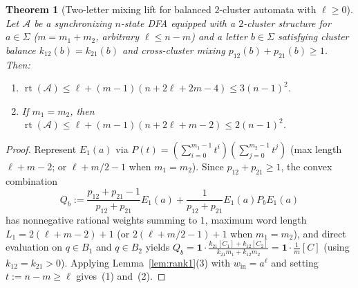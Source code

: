 \documentclass[11pt,a4paper]{article}
\newtheorem{theorem}{Theorem}[section]
\theoremstyle{definition}
\theoremstyle{remark}
\newcommand{\rt}{\operatorname{rt}}
\newcommand{\one}{\mathbf{1}}
\newcommand{\cA}{\mathcal{A}}
\newcommand{\ind}[1]{[#1]}
\begin{document}
\begin{theorem}[Two-letter mixing lift for balanced $2$-cluster automata with $\ell \ge 0$]
\label{thm:mixing}
Let $\cA$ be a synchronizing $n$-state DFA equipped with a $2$-cluster structure for $a \in \Sigma$ ($m = m_1 + m_2$, arbitrary $\ell \le n - m$) and a letter $b \in \Sigma$ satisfying cluster balance $k_{12}(b) = k_{21}(b)$ and cross-cluster mixing $p_{12}(b) + p_{21}(b) \ge 1$. Then:
\begin{enumerate}[label=(\arabic*),nosep]
  \item $\rt(\cA) \le \ell + (m - 1)(n + 2\ell + 2m - 4) \le 3(n - 1)^2$.
  \item If $m_1 = m_2$, then $\rt(\cA) \le \ell + (m - 1)(n + 2\ell + m - 2) \le 2(n - 1)^2$.
\end{enumerate}
\end{theorem}
\begin{proof}
Represent $E_1(a)$ via $P(t) = (\sum_{i=0}^{m_1-1} t^i)(\sum_{j=0}^{m_2-1} t^j)$ (max length $\ell + m - 2$; or $\ell + m/2 - 1$ when $m_1 = m_2$). Since $p_{12} + p_{21} \ge 1$, the convex combination
\[
  Q_b := \frac{p_{12} + p_{21} - 1}{p_{12} + p_{21}} E_1(a) + \frac{1}{p_{12} + p_{21}} E_1(a) P_b E_1(a)
\]
has nonnegative rational weights summing to $1$, maximum word length $L_1 = 2(\ell + m - 2) + 1$ (or $2(\ell + m/2 - 1) + 1$ when $m_1 = m_2$), and direct evaluation on $q \in B_1$ and $q \in B_2$ yields $Q_b = \one \cdot \frac{k_{21}\ind{C_1} + k_{12}\ind{C_2}}{k_{21}m_1 + k_{12}m_2} = \one \cdot \frac{1}{m}\ind{C}$ (using $k_{12} = k_{21} > 0$). Applying Lemma~\ref{lem:rank1}(3) with $w_{\mathrm{in}} = a^\ell$ and setting $t := n - m \ge \ell$ gives~(1) and~(2).
\end{proof}
\end{document}
